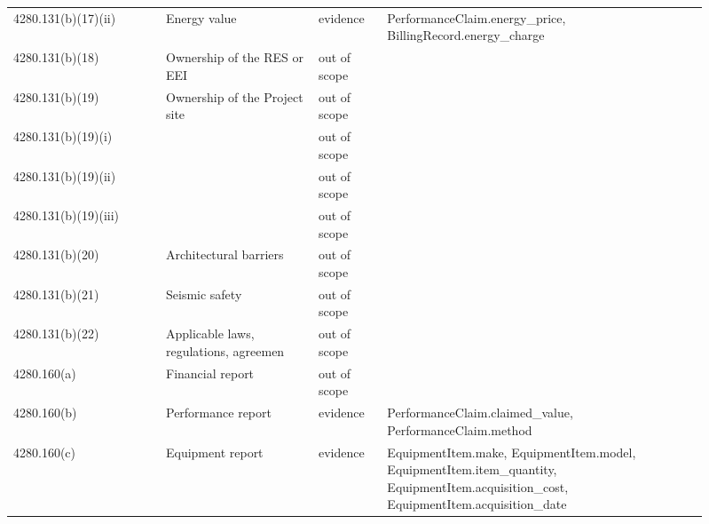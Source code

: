 \begin{longtable}{p{0.2\linewidth}p{0.2\linewidth}p{0.09\linewidth}p{0.42\linewidth}}
4280.131(b)(17)(ii) & Energy value & evidence & PerformanceClaim.energy\_price, BillingRecord.energy\_charge \\
4280.131(b)(18) & Ownership of the RES or EEI & out of scope &  \\
4280.131(b)(19) & Ownership of the Project site & out of scope &  \\
4280.131(b)(19)(i) &  & out of scope &  \\
4280.131(b)(19)(ii) &  & out of scope &  \\
4280.131(b)(19)(iii) &  & out of scope &  \\
4280.131(b)(20) & Architectural barriers & out of scope &  \\
4280.131(b)(21) & Seismic safety & out of scope &  \\
4280.131(b)(22) & Applicable laws, regulations, agreemen & out of scope &  \\
4280.160(a) & Financial report & out of scope &  \\
4280.160(b) & Performance report & evidence & PerformanceClaim.claimed\_value, PerformanceClaim.method \\
4280.160(c) & Equipment report & evidence & EquipmentItem.make, EquipmentItem.model, EquipmentItem.item\_quantity, EquipmentItem.acquisition\_cost, EquipmentItem.acquisition\_date \\
\hline
\end{longtable}
